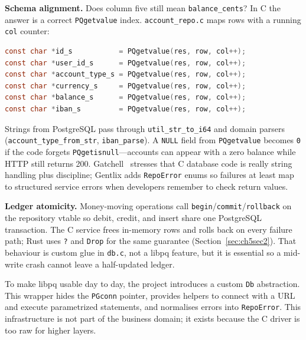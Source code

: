 \par \textbf{Schema alignment.} Does column five still mean \texttt{balance\_cents}? In C 
the answer is a correct \texttt{PQgetvalue} index. \texttt{account\_repo.c} maps rows with 
a running \texttt{col} counter:

\begin{lstlisting}[language=C, caption={account\_repo.c --- Column order must match SELECT
list order; a migration that reorders columns compiles but mis-loads balances.}]
const char *id_s           = PQgetvalue(res, row, col++);
const char *user_id_s      = PQgetvalue(res, row, col++);
const char *account_type_s = PQgetvalue(res, row, col++);
const char *currency_s     = PQgetvalue(res, row, col++);
const char *balance_s      = PQgetvalue(res, row, col++);
const char *iban_s         = PQgetvalue(res, row, col++);
\end{lstlisting}

\par Strings from PostgreSQL pass through \texttt{util\_str\_to\_i64} and domain parsers 
(\texttt{account\_type\_from\_str}, \texttt{iban\_parse}). A \texttt{NULL} field from 
\texttt{PQgetvalue} becomes \texttt{0} if the code forgets \texttt{PQgetisnull}---accounts 
can appear with a zero balance while HTTP still returns 200. Gatchell~\cite{Gatchell2003} 
stresses that C database code is really string handling plus discipline; Gentlix adds 
\texttt{RepoError} enums so failures at least map to structured service errors when 
developers remember to check return values.

\par \textbf{Ledger atomicity.} Money-moving operations call 
\texttt{begin}/\texttt{commit}/\texttt{rollback} on the repository vtable so debit, credit, 
and insert share one PostgreSQL transaction. The C service frees in-memory rows and rolls 
back on every failure path; Rust uses \texttt{?} and \texttt{Drop} for the same guarantee 
(Section~\ref{sec:ch5sec2}). That behaviour is custom glue in \texttt{db.c}, not a libpq 
feature, but it is essential so a mid-write crash cannot leave a half-updated ledger.

\par To make libpq usable day to day, the project introduces a custom \texttt{Db} abstraction. 
This wrapper hides the \texttt{PGconn} pointer, provides helpers to connect with a URL and 
execute parametrized statements, and normalises errors into \texttt{RepoError}. This 
infrastructure is not part of the business domain; it exists because the C driver is too 
raw for higher layers.


